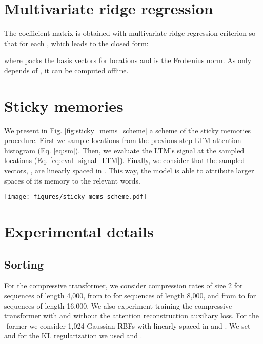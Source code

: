 \documentclass[11pt]{article}
\begin{document}



\clearpage
\appendix


\section{Multivariate ridge regression}
\label{app:reg}
The coefficient matrix  is obtained with multivariate ridge regression criterion so that  for each , which leads to the closed form:

where  packs the basis vectors for  locations and  is the Frobenius norm. As  only depends of , it can be computed offline.

\section{Sticky memories}
We present in Fig. \ref{fig:sticky_mems_scheme} a scheme of the sticky memories procedure.
First we sample  locations from the previous step LTM attention histogram (Eq. \ref{eq:sm}). Then, we evaluate the LTM's signal at the sampled locations (Eq. \ref{eq:eval_signal_LTM}). Finally, we consider that the sampled vectors, , are linearly spaced in . This way, the model is able to attribute larger spaces of its memory to the relevant words.
\label{app:sticky_mems}
\begin{figure*}[t]
  \centering
    \texttt{[image: figures/sticky\_mems\_scheme.pdf]}
  \caption{Sticky memories procedure diagram. The dashed vertical lines correspond to the position of the words in the LTM signal.}
  \label{fig:sticky_mems_scheme}
\end{figure*}


\section{Experimental details}
\subsection{Sorting}
\label{app:sorting}
For the compressive transformer, we consider compression rates of size 2 for sequences of length 4,000, from  to  for sequences of length 8,000, and from  to  for sequences of length 16,000. We also experiment training the compressive transformer with and without the attention reconstruction auxiliary loss. For the -former we consider 1,024 Gaussian RBFs  with  linearly spaced in  and . We set  and for the KL regularization we used  and .
\end{document}
